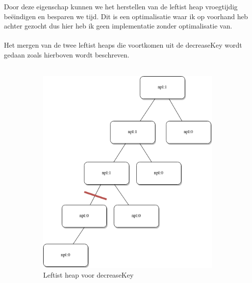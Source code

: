 \documentclass[10pt,a4paper,twoside]{article}
\begin{document}
Door deze eigenschap kunnen we het herstellen van de leftist heap vroegtijdig beëindigen en besparen we tijd. Dit is een optimalisatie waar ik op voorhand heb achter gezocht dus hier heb ik geen implementatie zonder optimalisatie van.
\\\\
Het mergen van de twee leftist heaps die voortkomen uit de {\selectfont decreaseKey} wordt gedaan zoals hierboven wordt beschreven.
\\\\
\begin{figure}[H]
    \begin{subfigure}{0.5\textwidth}
        \includegraphics[width=0.9\linewidth]{figures/leftistBefore.drawio.png}
        \caption{Leftist heap voor {\selectfont decreaseKey}}
        \label{fig:LeftistHeapBefore}
    \end{subfigure}
    \begin{subfigure}{0.5\linewidth}

\end{subfigure}
\end{figure}
\end{document}
